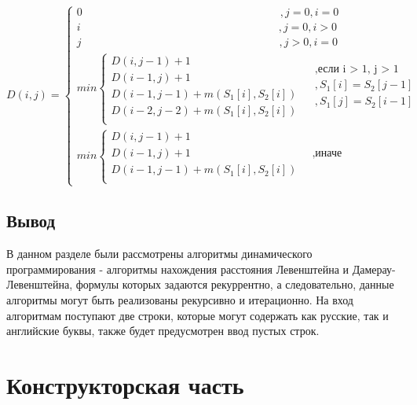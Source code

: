 \documentclass[a4paper,14pt, unknownkeysallowed]{bmstu}
\begin{document}
	\begin{equation}
    	\label{eq:DL}
    	D(i, j) = \begin{cases}
    	0  \qquad\qquad\qquad\qquad\qquad\qquad\qquad\qquad\qquad,j = 0, i = 0\\
    	i  \qquad\qquad\qquad\qquad\qquad\qquad\qquad\qquad\qquad,j = 0, i > 0\\
    	j  \qquad\qquad\qquad\qquad\qquad\qquad\qquad\qquad\qquad,j > 0, i = 0\\
    	min \begin{cases}
    		D(i, j - 1) + 1\\
    		D(i - 1, j) + 1\\
    		D(i - 1, j - 1) + m(S_{1}[i], S_{2}[i]) \\
    		D(i - 2, j - 2) + m(S_{1}[i], S_{2}[i]) \\
    	\end{cases}
    	\begin{aligned}
    		& , \text{если i > 1, j > 1} \\
    		& , S_{1}[i] = S_{2}[j - 1]  \\
    		& , S_{1}[j] =  S_{2}[i - 1] \\
    	\end{aligned}\\
    	min \begin{cases}
    		D(i, j - 1) + 1\\
    		D(i - 1, j) + 1 & \;\; \text{,иначе}\\
    		D(i - 1, j - 1) + m(S_{1}[i], S_{2}[i]) \\
    	\end{cases}
	\end{cases}
\end{equation}

\section{Вывод}

В данном разделе были рассмотрены алгоритмы динамического программирования - алгоритмы нахождения расстояния Левенштейна и Дамерау-Левенштейна, формулы которых задаются рекуррентно, а следовательно, данные алгоритмы могут быть реализованы рекурсивно и итерационно. На вход алгоритмам поступают две строки, которые могут содержать как русские, так и английские буквы, также будет предусмотрен ввод пустых строк.

\chapter{Конструкторская часть}
\end{document}
